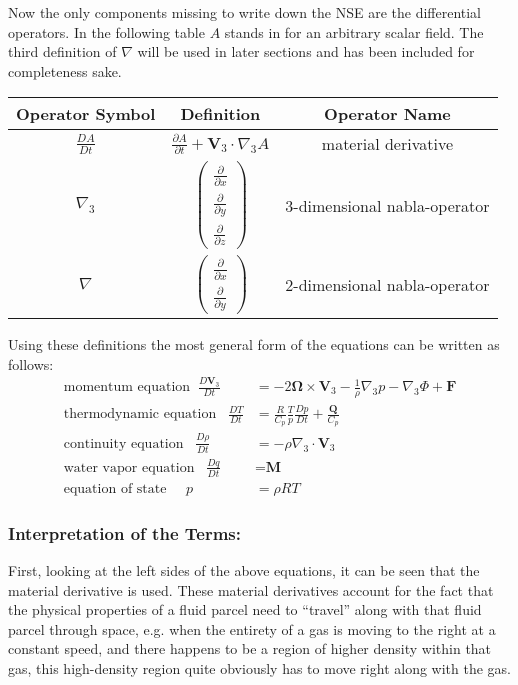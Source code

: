 Now the only components missing to write down the NSE are the differential operators.
In the following table $A$ stands in for an arbitrary scalar field.
The third definition of $\nabla$ will be used in later sections and has been included for completeness sake.

{\tabulinesep=0.5mm
\begin{center}
\begin{tabu}{c|c|c} 
\hline
Operator Symbol & Definition & Operator Name \\ 
\hline 
$\frac{DA}{Dt}$ & $\frac{\partial A}{\partial t}+\textbf{V}_3\cdot \nabla_3A$ & material derivative \\ 
\hline 
$\nabla _3$ & $\begin{pmatrix}
\frac{\partial }{\partial x} \\ 
\frac{\partial }{\partial y} \\ 
\frac{\partial }{\partial z}
\end{pmatrix}$ & 3-dimensional nabla-operator \\
\hline 
$\nabla$ & $\begin{pmatrix}
\frac{\partial }{\partial x} \\ 
\frac{\partial }{\partial y}
\end{pmatrix}$ & 2-dimensional nabla-operator
\end{tabu}
\end{center}}


Using these definitions the most general form of the equations can be written as follows:
\begin{align}
\text{momentum equation}\;\; \frac{D\textbf{V}_3}{Dt} &= -2\boldsymbol{\Omega}\times \textbf{V}_3 - \frac{1}{\rho}\nabla _3 p - \nabla _3 \Phi + \textbf{F} \label{eq_mom}\\
\text{thermodynamic equation}\;\;\; \frac{DT}{Dt} &= \frac{R}{C_p}\frac{T}{p}\frac{Dp}{Dt}+\frac{\textbf{Q}}{C_p}\label{eq_therm}\\
\text{continuity equation}\;\;\; \frac{D\rho}{Dt} &= -\rho \nabla _3 \cdot \textbf{V}_3\label{eq_cont}\\
\text{water vapor equation}\;\;\; \frac{Dq}{Dt} &= \textbf{M}\label{eq_water}\\
\text{equation of state}\;\;\;\;\; p &= \rho R T \label{eq_state}
\end{align}
\subsubsection{Interpretation of the Terms:}
First, looking at the left sides of the above equations, it can be seen that the material derivative is used.
These material derivatives account for the fact that the physical properties of a fluid parcel need to ``travel'' along with that fluid parcel through space, e.g. when the entirety of a gas is moving to the right at a constant speed, and there happens to be a region of higher density within that gas, this high-density region quite obviously has to move right along with the gas.

